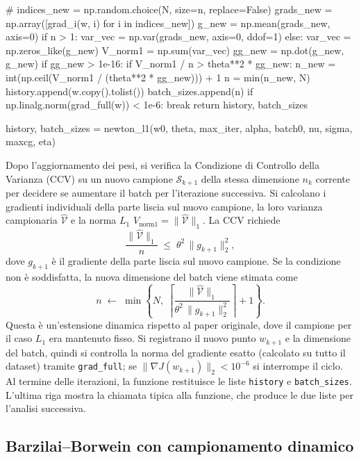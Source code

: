 \documentclass[a4paper,12pt]{article}
\numberwithin{equation}{section}
\numberwithin{figure}{section}
\numberwithin{table}{section}
\begin{document}
\begin{pythoncode}[title= Newton-L1]

#
        indices_new = np.random.choice(N, size=n, replace=False)
        grads_new = np.array([grad_i(w, i) for i in indices_new])
        g_new = np.mean(grads_new, axis=0)
        if n > 1:
            var_vec = np.var(grads_new, axis=0, ddof=1)
        else:
            var_vec = np.zeros_like(g_new)
        V_norm1 = np.sum(var_vec)
        gg_new = np.dot(g_new, g_new)
        if gg_new > 1e-16:
            if V_norm1 / n > theta**2 * gg_new:
                n_new = int(np.ceil(V_norm1 / (theta**2 * gg_new))) + 1
                n = min(n_new, N)
        history.append(w.copy().tolist())
        batch_sizes.append(n)
        if np.linalg.norm(grad_full(w)) < 1e-6:
            break
    return history, batch_sizes

history, batch_sizes = newton_l1(w0, theta, max_iter, alpha, batch0, nu, sigma, maxcg, eta)
\end{pythoncode}
Dopo l'aggiornamento dei pesi, si verifica la Condizione di Controllo della Varianza (CCV) su un nuovo campione $\mathcal{S}_{k+1}$ della stessa dimensione $n_k$ corrente per decidere se aumentare il batch per l'iterazione successiva. Si calcolano i gradienti individuali della parte liscia sul nuovo campione, la loro varianza campionaria $\widehat{\mathcal{V}}$ e la norma $L_1$ $V_{\text{norm1}}=\|\widehat{\mathcal{V}}\|_1$. La CCV richiede
\[
\frac{\|\widehat{\mathcal{V}}\|_1}{n} \;\le\; \theta^2\,\|g_{k+1}\|_2^2,
\]
dove $g_{k+1}$ è il gradiente della parte liscia sul nuovo campione. Se la condizione non è soddisfatta, la nuova dimensione del batch viene stimata come
\[
n \;\leftarrow\; \min\!\left\{N,\;\left\lceil\frac{\|\widehat{\mathcal{V}}\|_1}{\theta^2\,\|g_{k+1}\|_2^2}\right\rceil+1\right\}.
\]
Questa è un'estensione dinamica rispetto al paper originale, dove il campione per il caso $L_1$ era mantenuto fisso. Si registrano il nuovo punto $w_{k+1}$ e la dimensione del batch, quindi si controlla la norma del gradiente esatto (calcolato su tutto il dataset) tramite \texttt{grad\_full}; se $\|\nabla J(w_{k+1})\|_2 < 10^{-6}$ si interrompe il ciclo. Al termine delle iterazioni, la funzione restituisce le liste \texttt{history} e \texttt{batch\_sizes}. L'ultima riga mostra la chiamata tipica alla funzione, che produce le due liste per l'analisi successiva.

\subsection{Barzilai--Borwein con campionamento dinamico}
\end{document}
